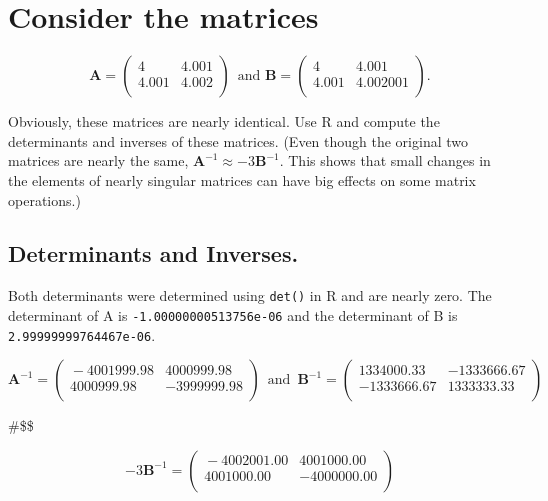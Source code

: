 \documentclass[11pt]{article}
\begin{document}
\section{Consider the matrices}
\label{sec-3}





\[ \mathbf{A} = \begin{pmatrix}{} 4 & 4.001 \\ 4.001 & 4.002
\\ \end{pmatrix}\,\textrm{ and }\mathbf{B} = \begin{pmatrix}{} 4 &
4.001 \\ 4.001 & 4.002001 \\ \end{pmatrix}. \]

Obviously, these matrices are nearly identical. Use R and compute the
determinants and inverses of these matrices. (Even though the original
two matrices are nearly the same, $\mathbf{A}^{-1} \approx
-3\mathbf{B}^{-1}$. This shows that small changes in the elements of
nearly singular matrices can have big effects on some matrix
operations.)
\subsection{Determinants and Inverses.}
\label{sec-3-1}


Both determinants were determined using \verb~det()~ in R and are nearly zero. The determinant of A is \texttt{-1.00000000513756e-06} 
and the determinant of B is \texttt{2.99999999764467e-06}.

\[
\mathbf{A}^{-1} = 
\begin{pmatrix}{}
-4001999.98 & 4000999.98 \\ 
4000999.98 & -3999999.98  \\ 
\end{pmatrix}\, \textrm{ and }\, 
\mathbf{B}^{-1} = 
\begin{pmatrix}{} 
1334000.33 & -1333666.67 \\ 
-1333666.67 &  1333333.33 \\ 
\end{pmatrix}
\]

\#\$\$ 

\[
-3\mathbf{B}^{-1} = \begin{pmatrix}{}
-4002001.00 & 4001000.00 \\ 4001000.00 & -4000000.00
\\ \end{pmatrix}
\]
\end{document}
